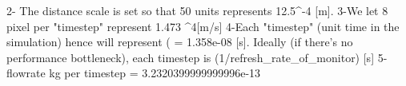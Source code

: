 
2- The distance scale is set so that 50 units represents 12.5^{-4} [m].
3-We let 8 pixel per "timestep" represent 1.473 ^4[m/s]
4-Each "timestep" (unit time in the simulation) hence will represent ( = 1.358e-08 [s]. Ideally (if there's no performance bottleneck), each timestep is (1/refresh_rate_of_monitor) [s]
5- flowrate kg per timestep = 3.2320399999999996e-13